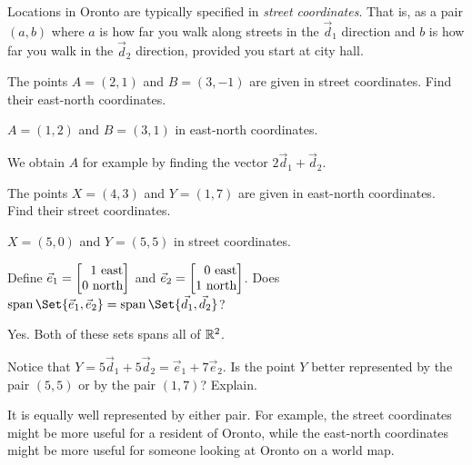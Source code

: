 \documentclass{workbook}
\begin{document}
\begin{slide}
	Locations in Oronto are typically specified in \emph{street coordinates}. That
	is, as a pair $(a,b)$ where $a$ is how far you walk along streets in the $\vec d_1$ direction
	and $b$ is how far you walk in the $\vec d_2$ direction, provided you start at city hall.

	\begin{parts}
		\item The points $A=(2,1)$ and $B=(3,-1)$ are given in street coordinates.
			Find their east-north coordinates.
			\begin{solution}
				$A=(1,2)$ and $B=(3,1)$ in east-north coordinates.

				We obtain $A$ for example by finding the vector $2\vec d_1+\vec d_2$.
			\end{solution}
		\item The points $X=(4,3)$ and $Y=(1,7)$ are given in east-north coordinates.
			Find their street coordinates.
			\begin{solution}[inline]
				$X=(5,0)$ and $Y=(5,5)$ in street coordinates.
			\end{solution}
		\item Define $\vec e_1=\mat{1\text{ east}\\0\text{ north}}$ and
			$\vec e_2=\mat{0\text{ east}\\1\text{ north}}$.
			Does $\Span\Set{\vec e_1,\vec e_2} = \Span\Set{\vec d_1,\vec d_2}$?
			\begin{solution}
				Yes. Both of these sets spans all of $\mathbb{R}^2$.
			\end{solution}
		\item Notice that $Y=5\vec d_1+5\vec d_2 = \vec e_1+7\vec e_2$. Is the point $Y$
			better represented by the pair $(5,5)$ or by the pair $(1,7)$? Explain.
			\begin{solution}
				It is equally well represented by either pair. For example, the
				street coordinates might be more useful for a resident of Oronto,
				while the east-north coordinates might be more useful for someone
				looking at Oronto on a world map.
			\end{solution}
	\end{parts}

\end{slide}
\end{document}
